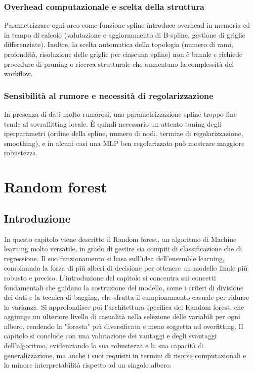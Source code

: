 \documentclass[a4paper,12pt]{report}
\begin{document}
	\subsection{Overhead computazionale e scelta della struttura}
	Parametrizzare ogni arco come funzione spline introduce overhead in memoria ed in tempo di calcolo (valutazione e aggiornamento di B-spline, gestione di griglie differenziate). Inoltre, la scelta automatica della topologia (numero di rami, profondità, risoluzione delle griglie per ciascuna spline) non è banale e richiede procedure di pruning o ricerca strutturale che aumentano la complessità del workflow.
	
	\subsection{Sensibilità al rumore e necessità di regolarizzazione}
	In presenza di dati molto rumorosi, una parametrizzazione spline troppo fine tende al sovraffitting locale. È quindi necessario un attento tuning degli iperparametri (ordine della spline, numero di nodi, termine di regolarizzazione, smoothing), e in alcuni casi una MLP ben regolarizzata può mostrare maggiore robustezza.
	
	\chapter{Random forest}
	
	\section{Introduzione}
	In questo capitolo viene descritto il Random forest, un algoritmo di Machine learning molto versatile, in grado di gestire sia compiti di classificazione che di regressione. Il suo funzionamento si basa sull'idea dell'ensemble learning, combinando la forza di più alberi di decisione per ottenere un modello finale più robusto e preciso. L'introduzione del capitolo si concentra sui concetti fondamentali che guidano la costruzione del modello, come i criteri di divisione dei dati e la tecnica di bagging, che sfrutta il campionamento casuale per ridurre la varianza. Si approfondisce poi l'architettura specifica del Random forest, che aggiunge un ulteriore livello di casualità nella selezione delle variabili per ogni albero, rendendo la "foresta" più diversificata e meno soggetta ad overfitting. Il capitolo si conclude con una valutazione dei vantaggi e degli svantaggi dell'algoritmo, evidenziando la sua robustezza e la sua capacità di generalizzazione, ma anche i suoi requisiti in termini di risorse computazionali e la minore interpretabilità rispetto ad un singolo albero. \cite{breiman2001randomforest, quinlan1993c45, breiman1996bagging, fatima2023xgbvsrf}
	
\end{document}
